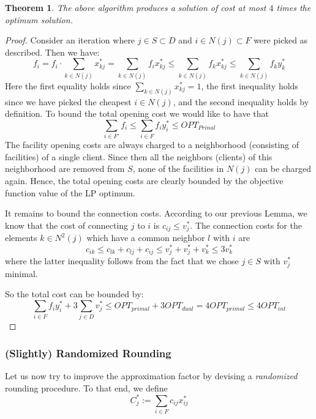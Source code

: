 \documentclass{article}
\newtheorem{theorem}{Theorem}
\begin{document}
\begin{theorem}
The above algorithm produces a solution of cost at most $4$ times the optimum solution.
\end{theorem}
\begin{proof}
Consider an iteration where $j\in S\subset D$ and $i\in N(j)\subset F$ were picked as described. Then we have:
\[
	f_i=f_i\cdot \sum_{k\in N(j)}x^*_{kj}= \sum_{k\in N(j)}f_i x^*_{kj} \leq \sum_{k\in N(j)}f_k x^*_{kj}\leq \sum_{k\in N(j)} f_k y^*_k
\]
Here the first equality holds since $\sum_{k\in N(j)}x^*_{kj}=1$, the first inequality holds since we have picked the cheapest $i\in N(j)$, and the second inequality holds by definition. To bound the total opening cost we would like to have that
\[
	\sum_{i\in F'} f_i \leq \sum_{i\in F}f_iy_i^* \leq OPT_{Prinal}
\]
The facility opening costs are always charged to a neighborhood (consisting of facilities) of a single client. Since then all the neighbors (clients) of this neighborhood are removed from $S$, none of the facilities in $N(j)$ can be charged again. Hence, the total opening costs are clearly bounded by the objective function value of the LP optimum.

It remains to bound the connection costs. According to our previous Lemma, we know that the cost of connecting $j$ to $i$ is $c_{ij}\leq v^*_j$. The connection costs for the elements $k\in N^2(j)$ which have a common neighbor $l$ with $i$ are
\[
	c_{ik}\leq c_{lk}+ c_{lj} + c_{ij} \leq v^*_j+v^*_j+v^*_k\leq 3 v^*_k
\]
where the latter inequality follows from the fact that we chose $j\in S$ with $v^*_j$ minimal.

So the total cost can be bounded by:
\[
	\sum_{i\in F} f_iy^*_i + 3\sum_{j\in D}v^*_j \leq OPT_{primal}+ 3 OPT_{dual}=4 OPT_{primal}\leq 4 OPT_{int}
\]
\end{proof}

\subsubsection{(Slightly) Randomized Rounding}
Let us now try to improve the approximation factor by devising a \emph{randomized} rounding procedure. To that end, we define
\[
	C^*_j:=\sum_{i\in F}c_{ij}x^*_{ij}
\]
\end{document}
